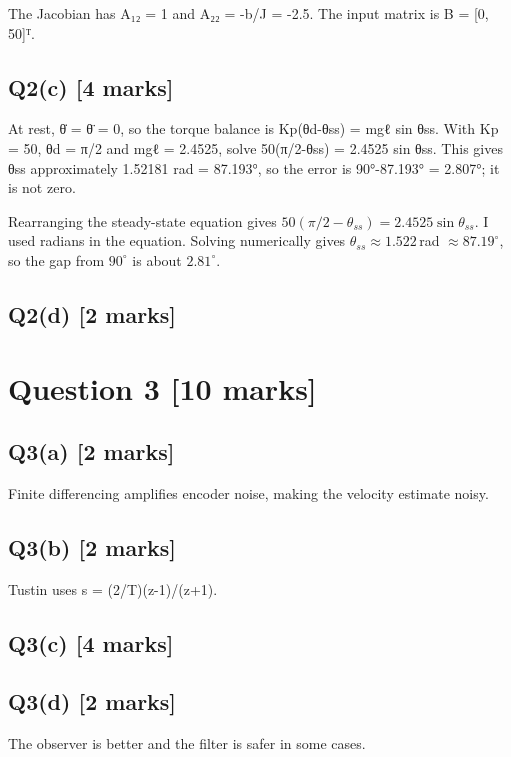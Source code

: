 \documentclass[11pt,a4paper]{article}
\begin{document}
The Jacobian has A₁₂ = 1 and A₂₂ = -b/J = -2.5.
The input matrix is B = [0, 50]ᵀ.

\subsection*{Q2(c) \hfill [4 marks]}

At rest, θ̇ = θ̈ = 0, so the torque balance is Kp(θd-θss) = mgℓ sin θss.
With Kp = 50, θd = π/2 and mgℓ = 2.4525, solve 50(π/2-θss) = 2.4525 sin θss.
This gives θss approximately 1.52181 rad = 87.193°, so the error is 90°-87.193° = 2.807°; it is not zero.\par\smallskip Rearranging the steady-state equation gives $50(\pi/2-\theta_{ss})=2.4525\sin\theta_{ss}$. I used radians in the equation. Solving numerically gives $\theta_{ss}\approx1.522\,$rad $\approx87.19^\circ$, so the gap from $90^\circ$ is about $2.81^\circ$.

\subsection*{Q2(d) \hfill [2 marks]}

\vspace{2mm}

\section*{Question 3 \hfill [10 marks]}
\subsection*{Q3(a) \hfill [2 marks]}

Finite differencing amplifies encoder noise, making the velocity estimate noisy.

\subsection*{Q3(b) \hfill [2 marks]}

Tustin uses s = (2/T)(z-1)/(z+1).

\subsection*{Q3(c) \hfill [4 marks]}

\vspace{2mm}

\subsection*{Q3(d) \hfill [2 marks]}

The observer is better and the filter is safer in some cases.
\end{document}
